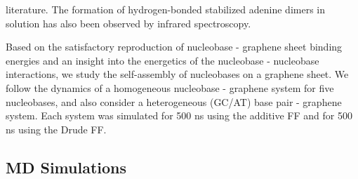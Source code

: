 literature.\supercite{verma_many_2010, burge_quadruplex_2006, cassidy_guanine-centric_2014} The formation of hydrogen-bonded stabilized adenine dimers in solution has also been observed by infrared spectroscopy.\supercite{hamlin_hydrogen-bonded_1965}

    Based on the satisfactory reproduction of nucleobase - graphene sheet binding energies and an insight into the energetics of the nucleobase - nucleobase interactions, we study the self-assembly of nucleobases on a graphene sheet. We follow the dynamics of a homogeneous nucleobase - graphene system for five nucleobases, and also consider a heterogeneous (GC/AT) base pair - graphene system. Each system was simulated for 500 ns using the additive FF and for 500 ns using the Drude FF.
    \subsection{MD Simulations}
